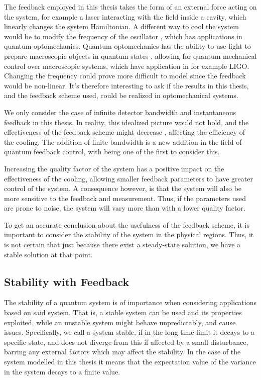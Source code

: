 The feedback employed in this thesis takes the form of an external force acting on the system, for example a laser interacting with the field inside a cavity, which linearly changes the system Hamiltonian. A different way to cool the system would be to modify the frequency of the oscillator \cite{Habibi:2016}, which has applications in quantum optomechanics. Quantum optomechanics has the ability to use light to prepare macroscopic objects in quantum states \cite{Chen:2013}, allowing for quantum mechanical control over macroscopic systems, which have application in for example LIGO. Changing the frequency could prove more difficult to model since the feedback would be non-linear. It's therefore interesting to ask if the results in this thesis, and the feedback scheme used, could be realized in optomechanical systems. 

We only consider the case of infinite detector bandwidth and instantaneous feedback in this thesis. In reality, this idealized picture would not hold, and the effectiveness of the feedback scheme might decrease \cite{Annby-Andersson:2024}, affecting the efficiency of the cooling. The addition of finite bandwidth is a new addition in the field of quantum feedback control, with \cite{De-Sousa:2025} being one of the first to consider this. 

Increasing the quality factor of the system has a positive impact on the effectiveness of the cooling, allowing smaller feedback parameters to have greater control of the system. A consequence however, is that the system will also be more sensitive to the feedback and measurement. Thus, if the parameters used are prone to noise, the system will vary more than with a lower quality factor.

To get an accurate conclusion about the usefulness of the feedback scheme, it is important to consider the stability of the system in the physical regions. Thus, it is not certain that just because there exist a steady-state solution, we have a stable solution at that point.



\subsection{Stability with Feedback}
The stability of a quantum system is of importance when considering applications based on said system. That is, a stable system can be used and its properties exploited, while an unstable system might behave unpredictably, and cause issues. Specifically, we call a system stable, if in the long time limit it decays to a specific state, and does not diverge from this if affected by a small disturbance, barring any external factors which may affect the stability. In the case of the system modelled in this thesis it means that the expectation value of the variance in the system decays to a finite value.


